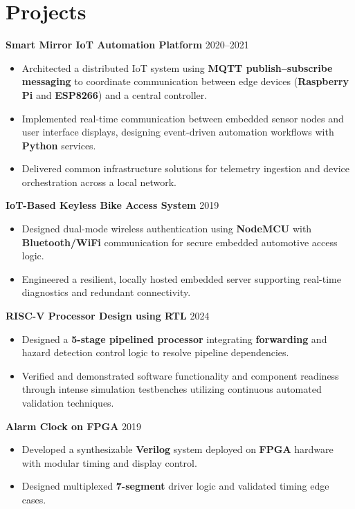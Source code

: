 \documentclass[letterpaper,11pt]{article}
\begin{document}
\section*{Projects}
\textbf{Smart Mirror IoT Automation Platform} \hfill 2020--2021
\begin{itemize}
\item Architected a distributed IoT system using \textbf{MQTT publish–subscribe messaging} to coordinate communication between edge devices (\textbf{Raspberry Pi} and \textbf{ESP8266}) and a central controller.
\item Implemented real-time communication between embedded sensor nodes and user interface displays, designing event-driven automation workflows with \textbf{Python} services.
\item Delivered common infrastructure solutions for telemetry ingestion and device orchestration across a local network.
\end{itemize}

\textbf{IoT-Based Keyless Bike Access System} \hfill 2019
\begin{itemize}
\item Designed dual-mode wireless authentication using \textbf{NodeMCU} with \textbf{Bluetooth/WiFi} communication for secure embedded automotive access logic.
\item Engineered a resilient, locally hosted embedded server supporting real-time diagnostics and redundant connectivity.
\end{itemize}

\textbf{RISC-V Processor Design using RTL} \hfill 2024
\begin{itemize}
\item Designed a \textbf{5-stage pipelined processor} integrating \textbf{forwarding} and hazard detection control logic to resolve pipeline dependencies.
\item Verified and demonstrated software functionality and component readiness through intense simulation testbenches utilizing continuous automated validation techniques.
\end{itemize}

\textbf{Alarm Clock on FPGA} \hfill 2019
\begin{itemize}
\item Developed a synthesizable \textbf{Verilog} system deployed on \textbf{FPGA} hardware with modular timing and display control.
\item Designed multiplexed \textbf{7-segment} driver logic and validated timing edge cases.
\end{itemize}
\end{document}
